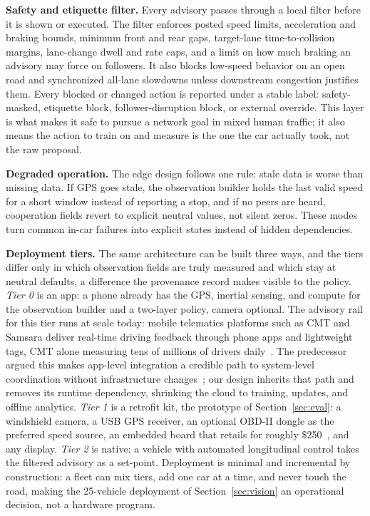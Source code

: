 \noindent\textbf{Safety and etiquette filter.}
Every advisory passes through a local filter before it is shown or executed. The filter enforces posted speed limits, acceleration and braking bounds, minimum front and rear gaps, target-lane time-to-collision margins, lane-change dwell and rate caps, and a limit on how much braking an advisory may force on followers. It also blocks low-speed behavior on an open road and synchronized all-lane slowdowns unless downstream congestion justifies them. Every blocked or changed action is reported under a stable label: safety-masked, etiquette block, follower-disruption block, or external override. This layer is what makes it safe to pursue a network goal in mixed human traffic; it also means the action to train on and measure is the one the car actually took, not the raw proposal.

\noindent\textbf{Degraded operation.}
The edge design follows one rule: stale data is worse than missing data. If GPS goes stale, the observation builder holds the last valid speed for a short window instead of reporting a stop, and if no peers are heard, cooperation fields revert to explicit neutral values, not silent zeros. These modes turn common in-car failures into explicit states instead of hidden dependencies.

\noindent\textbf{Deployment tiers.}
The same architecture can be built three ways, and the tiers differ only in which observation fields are truly measured and which stay at neutral defaults, a difference the provenance record makes visible to the policy. \emph{Tier 0} is an app: a phone already has the GPS, inertial sensing, and compute for the observation builder and a two-layer policy, camera optional. The advisory rail for this tier runs at scale today: mobile telematics platforms such as CMT and Samsara deliver real-time driving feedback through phone apps and lightweight tags, CMT alone measuring tens of millions of drivers daily~\cite{cmt2025,samsara2025}. The predecessor argued this makes app-level integration a credible path to system-level coordination without infrastructure changes~\cite{self_regulating_cars}; our design inherits that path and removes its runtime dependency, shrinking the cloud to training, updates, and offline analytics. \emph{Tier 1} is a retrofit kit, the prototype of Section~\ref{sec:eval}: a windshield camera, a USB GPS receiver, an optional OBD-II dongle as the preferred speed source, an embedded board that retails for roughly \$250~\cite{nvidia2023jetson}, and any display. \emph{Tier 2} is native: a vehicle with automated longitudinal control takes the filtered advisory as a set-point. Deployment is minimal and incremental by construction: a fleet can mix tiers, add one car at a time, and never touch the road, making the 25-vehicle deployment of Section~\ref{sec:vision} an operational decision, not a hardware program.
